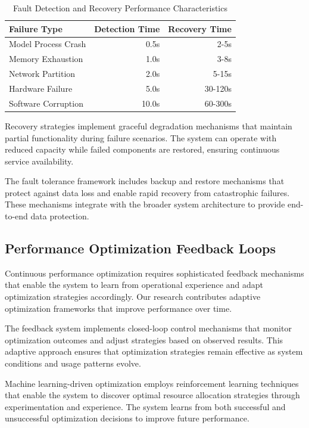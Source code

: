 \begin{table}[ht]
\centering
\begin{tabular}{@{}lrr@{}}
\toprule
\textbf{Failure Type} & \textbf{Detection Time} & \textbf{Recovery Time} \\
\midrule
Model Process Crash & 0.5s & 2-5s \\
Memory Exhaustion & 1.0s & 3-8s \\
Network Partition & 2.0s & 5-15s \\
Hardware Failure & 5.0s & 30-120s \\
Software Corruption & 10.0s & 60-300s \\
\bottomrule
\end{tabular}
\caption{Fault Detection and Recovery Performance Characteristics}
\end{table}

Recovery strategies implement graceful degradation mechanisms that maintain partial functionality during failure scenarios. The system can operate with reduced capacity while failed components are restored, ensuring continuous service availability.

The fault tolerance framework includes backup and restore mechanisms that protect against data loss and enable rapid recovery from catastrophic failures. These mechanisms integrate with the broader system architecture to provide end-to-end data protection.

\subsection*{Performance Optimization Feedback Loops}

Continuous performance optimization requires sophisticated feedback mechanisms that enable the system to learn from operational experience and adapt optimization strategies accordingly. Our research contributes adaptive optimization frameworks that improve performance over time.

The feedback system implements closed-loop control mechanisms that monitor optimization outcomes and adjust strategies based on observed results. This adaptive approach ensures that optimization strategies remain effective as system conditions and usage patterns evolve.

Machine learning-driven optimization employs reinforcement learning techniques that enable the system to discover optimal resource allocation strategies through experimentation and experience. The system learns from both successful and unsuccessful optimization decisions to improve future performance.

